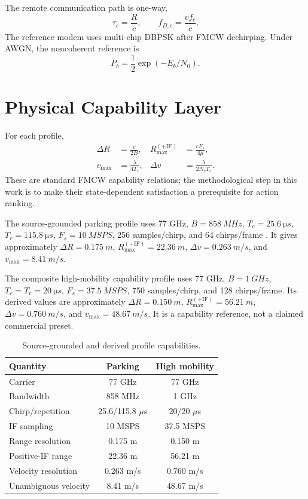\documentclass[conference,a4paper]{IEEEtran}
\begin{document}
The remote communication path is one-way,
\begin{equation}
\tau_c=\frac{R}{c},\qquad f_{D,c}=\frac{vf_c}{c}.
\end{equation}
The reference modem uses multi-chip DBPSK after FMCW dechirping. Under AWGN, the noncoherent reference is
\begin{equation}
P_b=\frac{1}{2}\exp(-E_b/N_0).
\end{equation}

\section{Physical Capability Layer}
For each profile,
\begin{align}
\Delta R &= \frac{c}{2B}, & R_{\max}^{(+\mathrm{IF})} &= \frac{cF_s}{4\mu},\\
v_{\max} &= \frac{\lambda}{4T_r}, & \Delta v &= \frac{\lambda}{2N_cT_r}.
\end{align}
These are standard FMCW capability relations; the methodological step in this work is to make their state-dependent satisfaction a prerequisite for action ranking.

The source-grounded parking profile uses 77 GHz, $B=\SI{858}{MHz}$, $T_c=\SI{25.6}{\micro s}$, $T_r=\SI{115.8}{\micro s}$, $F_s=\SI{10}{MSPS}$, 256 samples/chirp, and 64 chirps/frame \cite{tiParking}. It gives approximately $\Delta R=\SI{0.175}{m}$, $R_{\max}^{(+\mathrm{IF})}=\SI{22.36}{m}$, $\Delta v=\SI{0.263}{m/s}$, and $v_{\max}=\SI{8.41}{m/s}$.

The composite high-mobility capability profile uses 77 GHz, $B=\SI{1}{GHz}$, $T_c=T_r=\SI{20}{\micro s}$, $F_s=\SI{37.5}{MSPS}$, 750 samples/chirp, and 128 chirps/frame. Its derived values are approximately $\Delta R=\SI{0.150}{m}$, $R_{\max}^{(+\mathrm{IF})}=\SI{56.21}{m}$, $\Delta v=\SI{0.760}{m/s}$, and $v_{\max}=\SI{48.67}{m/s}$. It is a capability reference, not a claimed commercial preset.

\begin{table}[t]
\centering
\caption{Source-grounded and derived profile capabilities.}
\label{tab:profiles}
\begin{tabular}{lcc}\toprule
Quantity & Parking & High mobility\\\midrule
Carrier & 77 GHz & 77 GHz\\
Bandwidth & 858 MHz & 1 GHz\\
Chirp/repetition & 25.6/115.8 $\mu$s & 20/20 $\mu$s\\
IF sampling & 10 MSPS & 37.5 MSPS\\
Range resolution & 0.175 m & 0.150 m\\
Positive-IF range & 22.36 m & 56.21 m\\
Velocity resolution & 0.263 m/s & 0.760 m/s\\
Unambiguous velocity & 8.41 m/s & 48.67 m/s\\\bottomrule
\end{tabular}
\end{table}
\end{document}
